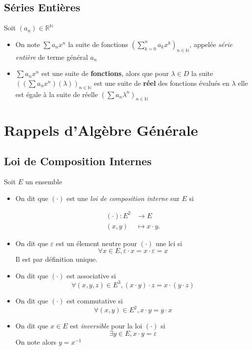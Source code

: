 \documentclass[11pt,colorlinks]{book}
\theoremstyle{mytheoremstyle}
\theoremstyle{mytheoremstyle}
\theoremstyle{mytheoremstyle}
\theoremstyle{mytheoremstyle}
\theoremstyle{mytheoremstyle}
\theoremstyle{mytheoremstyle}
\theoremstyle{mytheoremstyle}
\theoremstyle{mytheoremstyle}
\theoremstyle{myproblemstyle}
\def\mbb#1{\mathbb{#1}}
\def\bN{\mbb{N}}
\def\bR{\mbb{R}}
\def\rN{\bR^{\bN}}
\newcommand{\vfunc}[5]{
  \begin{align*}
    #1 \colon #2 &\to #3\\
    #4 &\mapsto #5.
  \end{align*}
}
\begin{document}
\subsection{Séries Entières}
\begin{rmq}
  Soit $(a_n) \in \rN$ 
  \begin{itemize}
    \item On note $\sum a_n x^n$ la suite de fonctions $\left(\sum_{k=0}^n a_k x^k\right)_{n\in \bN}$, appelée
    \textit{série entière} de terme général $a_n$
    \item $\sum a_n x^n$ est une suite de \textbf{fonctions}, alors que pour $\lambda \in D$ la suite $\left(\left(\sum a_n x^n\right)(\lambda)\right)_{n \in \bN}$
    est une suite de \textbf{réel} des fonctions évalués en $\lambda$ elle est égale à la suite de réelle $\left(\sum a_n \lambda^n\right)_{n \in \bN}$
    \end{itemize}
\end{rmq}
\section{Rappels d'Algèbre Générale}
\subsection{Loi de Composition Internes}
\begin{rmq}
  Soit $E$ un ensemble
  \begin{itemize}
    \item On dit que $(\cdot)$ est une \textit{loi de composition interne} sur $E$ si 
    \vfunc{(\cdot)}{E^2}{E}{(x,y)}{x\cdot y}
    \item On dit que $\varepsilon$ est un élement neutre pour $(\cdot)$ une lci si 
    \begin{equation*}
      \forall x \in E, \varepsilon \cdot x = x \cdot \varepsilon = x
    \end{equation*}
    Il est par définition unique.
    \item On dit que $(\cdot)$ est associative si 
    \begin{equation*}
      \forall (x,y,z) \in E^3, (x \cdot y) \cdot z = x \cdot (y \cdot z)
    \end{equation*}
    \item On dit que $(\cdot)$ est commutative si 
    \begin{equation*}
      \forall (x,y) \in E^2, x \cdot y = y \cdot x
    \end{equation*}
    \item On dit que $x \in E$ est \textit{inversible} pour la loi $(\cdot)$ si 
    \begin{equation*}
      \exists y \in E, x\cdot y = \varepsilon
    \end{equation*}
    On note alors $y = x^{-1}$
  \end{itemize}
\end{rmq}
\end{document}
